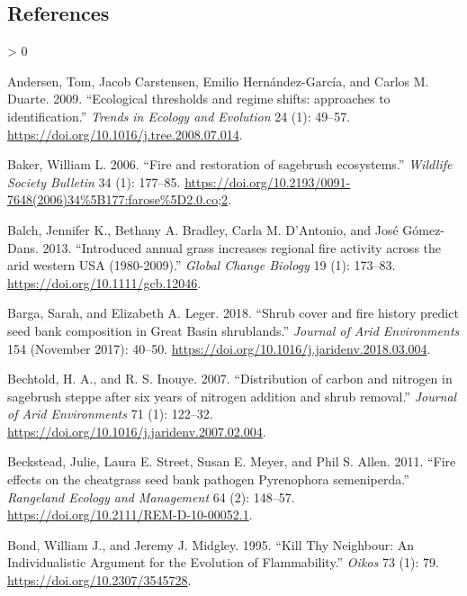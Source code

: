 \documentclass[
  12pt,
]{article}
\newlength{\cslhangindent}
\newenvironment{CSLReferences}[2] %
 {%
  \setlength{\parindent}{0pt}
  \ifodd #1 \everypar{\setlength{\hangindent}{\cslhangindent}}\ignorespaces\fi
  \ifnum #2 > 0
  \setlength{\parskip}{#2\baselineskip}
  \fi
 }%
 {}
\begin{document}
\hypertarget{references}{%
\subsection{References}\label{references}}

\hypertarget{refs}{}
\begin{CSLReferences}{1}{0}
\leavevmode\hypertarget{ref-Andersen2009}{}%
Andersen, Tom, Jacob Carstensen, Emilio Hernández-García, and Carlos M.
Duarte. 2009. {``{Ecological thresholds and regime shifts: approaches to
identification}.''} \emph{Trends in Ecology and Evolution} 24 (1):
49--57. \url{https://doi.org/10.1016/j.tree.2008.07.014}.

\leavevmode\hypertarget{ref-Baker2006}{}%
Baker, William L. 2006. {``{Fire and restoration of sagebrush
ecosystems}.''} \emph{Wildlife Society Bulletin} 34 (1): 177--85.
\url{https://doi.org/10.2193/0091-7648(2006)34\%5B177:farose\%5D2.0.co;2}.

\leavevmode\hypertarget{ref-Balch2013}{}%
Balch, Jennifer K., Bethany A. Bradley, Carla M. D'Antonio, and José
Gómez-Dans. 2013. {``{Introduced annual grass increases regional fire
activity across the arid western USA (1980-2009)}.''} \emph{Global
Change Biology} 19 (1): 173--83.
\url{https://doi.org/10.1111/gcb.12046}.

\leavevmode\hypertarget{ref-Barga2018}{}%
Barga, Sarah, and Elizabeth A. Leger. 2018. {``{Shrub cover and fire
history predict seed bank composition in Great Basin shrublands}.''}
\emph{Journal of Arid Environments} 154 (November 2017): 40--50.
\url{https://doi.org/10.1016/j.jaridenv.2018.03.004}.

\leavevmode\hypertarget{ref-Bechtold2007}{}%
Bechtold, H. A., and R. S. Inouye. 2007. {``{Distribution of carbon and
nitrogen in sagebrush steppe after six years of nitrogen addition and
shrub removal}.''} \emph{Journal of Arid Environments} 71 (1): 122--32.
\url{https://doi.org/10.1016/j.jaridenv.2007.02.004}.

\leavevmode\hypertarget{ref-Beckstead2011}{}%
Beckstead, Julie, Laura E. Street, Susan E. Meyer, and Phil S. Allen.
2011. {``{Fire effects on the cheatgrass seed bank pathogen Pyrenophora
semeniperda}.''} \emph{Rangeland Ecology and Management} 64 (2):
148--57. \url{https://doi.org/10.2111/REM-D-10-00052.1}.

\leavevmode\hypertarget{ref-Bond1995}{}%
Bond, William J., and Jeremy J. Midgley. 1995. {``{Kill Thy Neighbour:
An Individualistic Argument for the Evolution of Flammability}.''}
\emph{Oikos} 73 (1): 79. \url{https://doi.org/10.2307/3545728}.


\end{CSLReferences}
\end{document}

